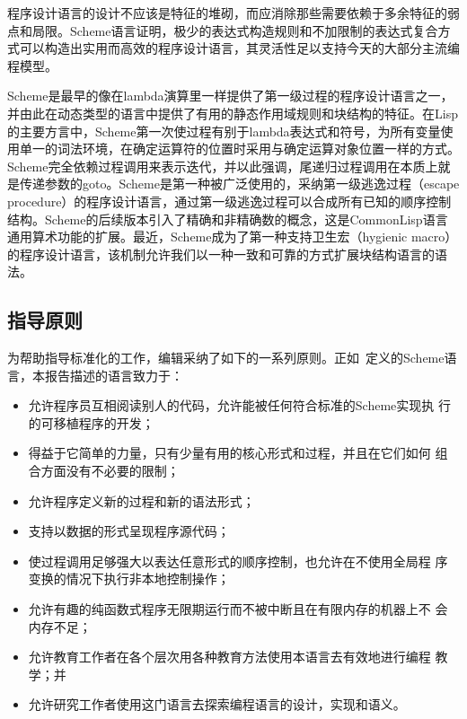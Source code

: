
\label{historysection}

程序设计语言的设计不应该是特征的堆砌，而应消除那些需要依赖于多余特征的弱点和局限。Scheme语言证明，极少的表达式构造规则和不加限制的表达式复合方式可以构造出实用而高效的程序设计语言，其灵活性足以支持今天的大部分主流编程模型。

Scheme是最早的像在lambda演算里一样提供了第一级过程的程序设计语言之一，并由此在动态类型的语言中提供了有用的静态作用域规则和块结构的特征。在Lisp的主要方言中，Scheme第一次使过程有别于lambda表达式和符号，为所有变量使用单一的词法环境，在确定运算符的位置时采用与确定运算对象位置一样的方式。Scheme完全依赖过程调用来表示迭代，并以此强调，尾递归过程调用在本质上就是传递参数的goto。Scheme是第一种被广泛使用的，采纳第一级逃逸过程（escape procedure）的程序设计语言，通过第一级逃逸过程可以合成所有已知的顺序控制结构。Scheme的后续版本引入了精确和非精确数的概念，这是CommonLisp语言通用算术功能的扩展。最近，Scheme成为了第一种支持卫生宏（hygienic macro）的程序设计语言，该机制允许我们以一种一致和可靠的方式扩展块结构语言的语法。

\subsection*{指导原则}

为帮助指导标准化的工作，编辑采纳了如下的一系列原则。正如~\cite{R5RS}定义的Scheme语言，本报告描述的语言致力于：


\begin{itemize}
\item 允许程序员互相阅读别人的代码，允许能被任何符合标准的Scheme实现执
  行的可移植程序的开发；

\item 得益于它简单的力量，只有少量有用的核心形式和过程，并且在它们如何
  组合方面没有不必要的限制；

\item 允许程序定义新的过程和新的语法形式；

\item 支持以数据的形式呈现程序源代码；

\item 使过程调用足够强大以表达任意形式的顺序控制，也允许在不使用全局程
  序变换的情况下执行非本地控制操作；

\item 允许有趣的纯函数式程序无限期运行而不被中断且在有限内存的机器上不
  会内存不足；

\item 允许教育工作者在各个层次用各种教育方法使用本语言去有效地进行编程
  教学；并

\item 允许研究工作者使用这门语言去探索编程语言的设计，实现和语义。
\end{itemize}

